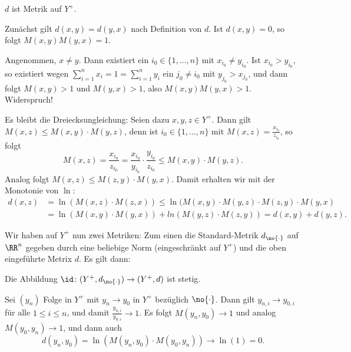 \begin{lemma}
	\label{lemma:13.12}
	$d$ ist Metrik auf $Y^+$.
\end{lemma}

\begin{beweis}
	Zunächst gilt $d(x,y) = d(y,x)$ nach Definition von $d$.
	Ist $d(x,y) = 0$, so folgt $M(x,y)M(y,x) = 1$.
	
	Angenommen, $x \neq y$.
	Dann existiert ein $i_0 \in \{1,\dots,n\}$ mit $x_{i_0} \neq y_{i_0}$.
	Ist $x_{i_0} > y_{i_0}$, so existiert wegen $\sum_{i=1}^{n} x_i = 1 = \sum_{i=1}^{n} y_i$ ein $j_0 \neq i_0$ mit $y_{j_0} > x_{j_0}$, und dann folgt $M(x,y) > 1$ und $M(y,x) > 1$, also $M(x,y)M(y,x) > 1$.
	Widerspruch!
	
	Es bleibt die Dreiecksungleichung:
	Seien dazu $x,y,z \in Y^+$.
	Dann gilt $M(x,z) \leq M(x,y) \cdot M(y,z)$, denn ist $i_0 \in \{1,\dots,n\}$ mit $M(x,z) = \frac{x_{i_0}}{z_{i_0}}$, so folgt
	\[
		M(x,z) = \frac{x_{i_0}}{z_{i_0}} = \frac{x_{i_0}}{y_{i_0}} \cdot \frac{y_{i_0}}{z_{i_0}} \leq M(x,y) \cdot M(y,z).
	\]
	Analog folgt $M(x,z) \leq M(z,y) \cdot M(y,x)$.
	Damit erhalten wir mit der Monotonie von $\ln$:
	\begin{align*}
		d(x,z) &= \ln(M(x,z) \cdot M(z,x)) \leq \ln(M(x,y)\cdot M(y,z) \cdot M(z,y) \cdot M(y,x) \\
		&= \ln(M(x,y) \cdot M(y,x)) + ln(M(y,z) \cdot M(z,y)) = d(x,y) + d(y,z). 
	\end{align*}
\end{beweis}

Wir haben auf $Y^+$ nun zwei Metriken:
Zum einen die Standard-Metrik $d_{\no{\cdot}}$ auf $\RR^n$ gegeben durch eine beliebige Norm (eingeschränkt auf $Y^+$) und die oben eingeführte Metrix $d$.
Es gilt dann:
\newpage
\begin{lemma}
	\label{lemma:13.14}
	Die Abbildung $\id\colon (Y^+,d_{\no{\cdot}}) \rightarrow (Y^+,d)$ ist stetig.
\end{lemma}

\begin{beweis}
	Sei $(y_n)$ Folge in $Y^+$ mit $y_n \rightarrow y_0$ in $Y^+$ bezüglich $\no{\cdot}$.
	Dann gilt $y_{n,i} \rightarrow y_{0,i}$ für alle $1 \leq i \leq n$, und damit $\frac{y_{n,i}}{y_{0,i}} \rightarrow 1$.
	Es folgt $M(y_n,y_0) \rightarrow 1$ und analog $M(y_0,y_n) \rightarrow 1$, und dann auch
	\[
		d(y_n,y_0) = \ln(M(y_n,y_0) \cdot M(y_0,y_n)) \rightarrow \ln(1) = 0. 
	\]
\end{beweis}


